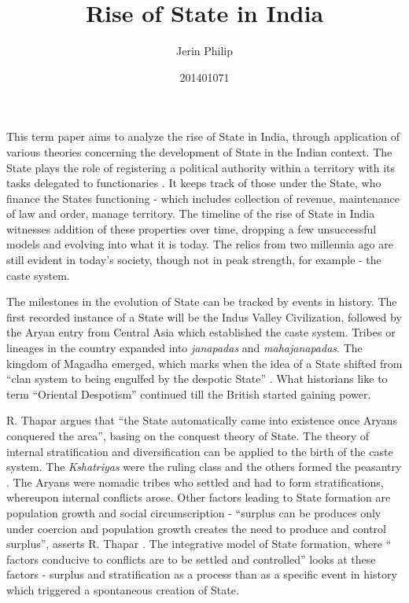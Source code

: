 \documentclass[a4paper]{article}
\title{Rise of State in India}
\author{Jerin Philip}
\date{201401071}
\begin{document}
\maketitle
This term paper aims to analyze the rise of State in India, through
application of various theories concerning the development of State in
the Indian context.  
The State plays the role of registering a political authority within a
territory with its tasks delegated to functionaries \cite[p.
11]{thapar1984lineage}. It keeps track of \cite[p.
12-13]{thapar1984lineage} those under the State, who finance the States
functioning - which includes collection of revenue, maintenance of law
and order, manage territory. The timeline of the rise of State in India
witnesses addition of these properties over time, dropping a few
unsuccessful models and evolving into what it is today. The relics from
two millennia ago are still evident in today's society, though not in
peak strength, for example - the caste system.

The milestones in the evolution of State can be tracked by events in
history.  The first recorded instance of a State will be the Indus
Valley Civilization, followed by the Aryan entry from Central Asia which
established the caste system. Tribes or lineages in the country expanded
into \textit{janapadas} and \textit{mahajanapadas}. The kingdom of
Magadha emerged, which marks when the idea of a State shifted from
``clan system to being engulfed by the despotic State'' \cite[p.
5]{thapar1984lineage}. What historians like to term ``Oriental
Despotism'' continued till the British started gaining power. 

R. Thapar argues \cite[p.4]{thapar1984lineage} that ``the State
automatically came into existence once Aryans conquered the area'',
basing on the conquest theory of State. The theory of internal
stratification and diversification can be applied to the birth of the
caste system. The \textit{Kshatriyas} were the ruling class and the
others formed the peasantry \cite[p.  4]{thapar1984lineage}. The Aryans
were nomadic tribes who settled and had to form stratifications,
whereupon internal conflicts arose. Other factors leading to State
formation are population growth and social circumscription - ``surplus
can be produces only under coercion and population growth creates the
need to produce and control surplus'', asserts R. Thapar \cite[p.
8]{thapar1984lineage}. The integrative model of State formation, where
`` factors conducive to conflicts are to be settled and controlled''
\cite[p. 8]{thapar1984lineage} looks at these factors - surplus and
stratification as a process than as a specific event in history which
triggered a spontaneous creation of State. 
\end{document}
